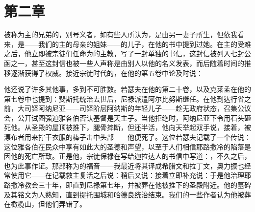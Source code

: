 
\section{第二章}

被称为主的兄弟的，别号义者，如有些人所认为，是由另一妻子所生，但依我看来，是——我们的主的母亲的姐妹——的儿子，在他的书中提到过她。在主的受难之后，他立即被宗徒们任命为的主教，写了一封单独的书信，这封信被列入七封公函之一，甚至这封信也被一些人声称是由别人以他的名义发表，而后随着时间的推移逐渐获得了权威。接近宗徒时代的，在他的第五卷中论及时说：\par

\par

他还说了许多其他事，多到不可胜数。若瑟夫在他的第二十卷，以及克莱孟在他的第七卷中也提到：斐斯托统治去世后，尼禄派遣阿尔比努斯继任。在他到达行省之前，大司铎阿纳尼亚——司铎阶层阿纳斯的年轻儿子——趁无政府状态，召集公议会，公开试图强迫雅各伯否认基督是天主子。当他拒绝时，阿纳尼亚下令用石头砸死他。从圣殿的屋顶被推下，腿骨摔断，但还半活，他向天举起双手说，接着，被漂布者用来拧干衣服的棒子击中头部——他便死了。这位若瑟夫记载了一个传说：这位雅各伯在民众中享有如此大的圣德和声望，以至于人们相信耶路撒冷的陷落是因他的死亡所致。正是他，宗徒保禄在写给迦拉达人的书信中写道：，不久之后，也为此事作证。那部称为的福音——我最近将其译成希腊文和拉丁文，奥力振也经常使用它——在记载救主复活之后说：稍后又说：接着立即补充说：于是他治理耶路撒冷教会三十年，即直到尼禄第七年，并被葬在他被推下的圣殿附近。他的墓碑及其铭文为人熟知，直到提托围城和哈德良统治结束。我们的一些作者认为他被葬在橄榄山，但他们弄错了。\par

